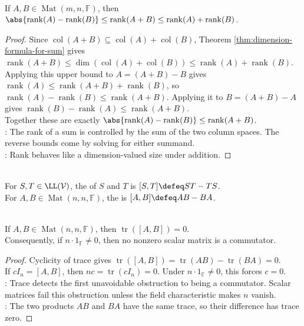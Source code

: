 \begin{theorem} \label{thm:rank-triangle-inequality} \\
If $A,B\in\operatorname{Mat}(m,n,\mathbb{F})$, then $\abs{\operatorname{rank}(A)-\operatorname{rank}(B)} \leq \operatorname{rank}(A+B) \leq \operatorname{rank}(A)+\operatorname{rank}(B)$.
\begin{proof}
Since $\operatorname{col}(A+B)\subseteq\operatorname{col}(A)+\operatorname{col}(B)$, Theorem \ref{thm:dimension-formula-for-sum} gives $\operatorname{rank}(A+B)\leq\dim(\operatorname{col}(A)+\operatorname{col}(B))\leq\operatorname{rank}(A)+\operatorname{rank}(B)$.
Applying this upper bound to $A=(A+B)-B$ gives $\operatorname{rank}(A)\leq\operatorname{rank}(A+B)+\operatorname{rank}(B)$, so $\operatorname{rank}(A)-\operatorname{rank}(B)\leq\operatorname{rank}(A+B)$. Applying it to $B=(A+B)-A$ gives $\operatorname{rank}(B)-\operatorname{rank}(A)\leq\operatorname{rank}(A+B)$.\\
Together these are exactly $\abs{\operatorname{rank}(A)-\operatorname{rank}(B)}\leq\operatorname{rank}(A+B)$.\\
: The rank of a sum is controlled by the sum of the two column spaces. The reverse bounds come by solving for either summand.\\
: Rank behaves like a dimension-valued size under addition.
\end{proof}
\end{theorem}

\begin{definition} \\
For $S,T\in\LL(\mathcal{V})$, the  of $S$ and $T$ is $[S,T]\defeq ST-TS$.\\
For $A,B\in\operatorname{Mat}(n,n,\mathbb{F})$, the  is $[A,B]\defeq AB-BA$.
\end{definition}

\begin{proposition} \label{prop:commutators-have-zero-trace} \\
If $A,B\in\operatorname{Mat}(n,n,\mathbb{F})$, then $\operatorname{tr}([A,B])=0$.\\
Consequently, if $n\cdot1_{\mathbb{F}}\neq0$, then no nonzero scalar matrix is a commutator.
\begin{proof}
Cyclicity of trace gives $\operatorname{tr}([A,B])=\operatorname{tr}(AB)-\operatorname{tr}(BA)=0$.\\
If $cI_n=[A,B]$, then $nc=\operatorname{tr}(cI_n)=0$. Under $n\cdot1_{\mathbb{F}}\neq0$, this forces $c=0$.\\
: Trace detects the first unavoidable obstruction to being a commutator. Scalar matrices fail this obstruction unless the field characteristic makes $n$ vanish.\\
: The two products $AB$ and $BA$ have the same trace, so their difference has trace zero.
\end{proof}
\end{proposition}

